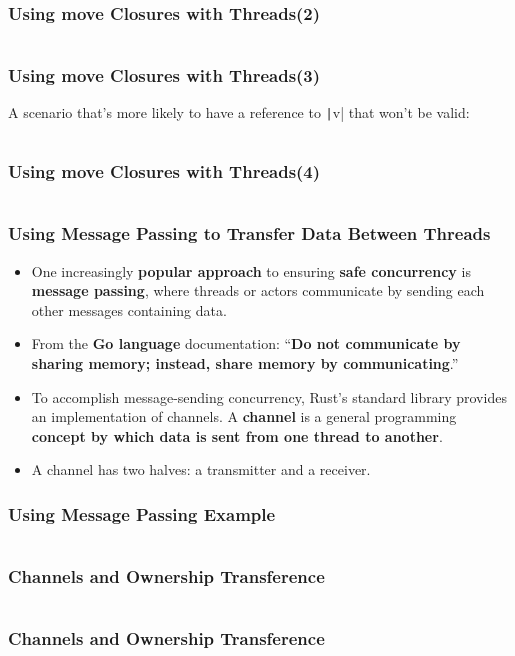 \documentclass{beamer}
\begin{document}
\begin{frame}[fragile]
	\frametitle{Using move Closures with Threads(2)}
	\inputminted{shell}{./code/thread2.shell}
\end{frame}

\begin{frame}[fragile]
	\frametitle{Using move Closures with Threads(3)}
	A scenario that’s more likely to have a reference to \texttt|v| that won’t be valid:
	\inputminted{rust}{./code/thread3.rs}
\end{frame}

\begin{frame}[fragile]
	\frametitle{Using move Closures with Threads(4)}
	\inputminted{rust}{./code/thread4.rs}
\end{frame}



\begin{frame}[fragile]
	\frametitle{Using Message Passing to Transfer Data Between Threads}
	\begin{itemize}
		\item One increasingly \textbf{popular approach} to ensuring \textbf{safe concurrency} is \textbf{message passing}, where threads or actors communicate by sending each other messages containing data. 
		\item 	From the \textbf{Go language} documentation: “\textbf{Do not communicate by sharing memory; instead, share memory by communicating}.”
		\item 	To accomplish message-sending concurrency, Rust's standard library provides an implementation of channels. A \textbf{channel} is a general programming \textbf{concept by which data is sent from one thread to another}.
		\item A channel has two halves: a transmitter and a receiver. 
	\end{itemize}
\end{frame}

\begin{frame}[fragile]
	\frametitle{Using Message Passing Example}
	\inputminted{rust}{./code/thread5.rs}
\end{frame}


\begin{frame}[fragile]
	\frametitle{Channels and Ownership Transference}
	\inputminted{rust}{./code/thread6.rs}
\end{frame}

\begin{frame}[fragile]
	\frametitle{Channels and Ownership Transference}
	\inputminted{shell}{./code/thread6.shell}
\end{frame}
\end{document}
